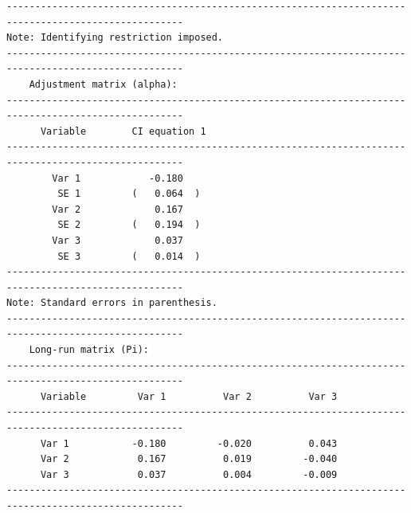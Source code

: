 \documentclass[10pt]{article}
\begin{document}
\begin{verbatim}
-----------------------------------------------------------------------------------------------------
Note: Identifying restriction imposed.                                                               
-----------------------------------------------------------------------------------------------------
    Adjustment matrix (alpha):                                                                         
-----------------------------------------------------------------------------------------------------
      Variable        CI equation 1  
-----------------------------------------------------------------------------------------------------
        Var 1            -0.180     
         SE 1         (   0.064  )  
        Var 2             0.167     
         SE 2         (   0.194  )  
        Var 3             0.037     
         SE 3         (   0.014  )  
-----------------------------------------------------------------------------------------------------
Note: Standard errors in parenthesis.                                                                
-----------------------------------------------------------------------------------------------------
    Long-run matrix (Pi):                                                                       
-----------------------------------------------------------------------------------------------------
      Variable         Var 1          Var 2          Var 3   
-----------------------------------------------------------------------------------------------------
      Var 1           -0.180         -0.020          0.043    
      Var 2            0.167          0.019         -0.040    
      Var 3            0.037          0.004         -0.009    
-----------------------------------------------------------------------------------------------------


\end{verbatim}
\end{document}
